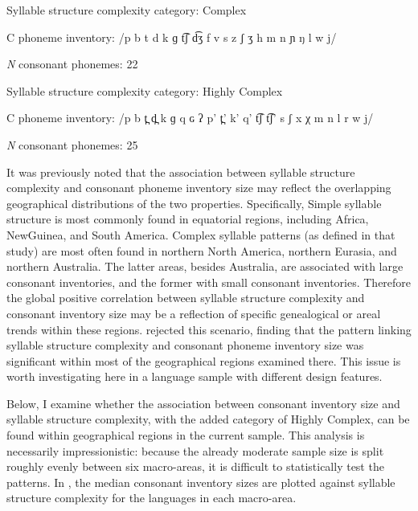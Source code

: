 \ea\label{ex:4.24}
\begin{Coding}
\item[Syllable structure complexity category:] Complex

\item[C phoneme inventory:] /p b t d k ɡ t͡ʃ d͡ʒ f v s z ʃ ʒ h m n ɲ ŋ l w j/

\item[\textit{N} consonant phonemes:] 22
\end{Coding}
\z

\ea\label{ex:4.25}
\begin{Coding}
\item[Syllable structure complexity category:] Highly Complex

\item[C phoneme inventory:] /p b t̪ d̪ k ɡ q ɢ ʔ p’ t̪’ k’ q’ t͡ʃ t͡ʃ’ s ʃ x χ m n l r w j/

\item[\textit{N} consonant phonemes:] 25
\end{Coding}
\z

  It was previously noted that the association between syllable structure complexity and consonant phoneme inventory size may reflect the overlapping geographical distributions of the two properties. Specifically, Simple syllable structure is most commonly found in equatorial regions, including Africa, New\linebreak Guinea, and South America. Complex syllable patterns (as defined in that study) are most often found in northern North America, northern Eurasia, and northern Australia. The latter areas, besides Australia, are associated with large consonant inventories, and the former with small consonant inventories. Therefore the global positive correlation between syllable structure complexity and consonant inventory size may be a reflection of specific genealogical or areal trends within these regions. \citet{Maddieson2006} rejected this scenario, finding that the pattern linking syllable structure complexity and consonant phoneme inventory size was significant within most of the geographical regions examined there. This issue is worth investigating here in a language sample with different design features.

  Below, I examine whether the association between consonant inventory size and syllable structure complexity, with the added category of Highly Complex, can be found within geographical regions in the current sample. This analysis is necessarily impressionistic: because the already moderate sample size is split roughly evenly between six macro-areas, it is difficult to statistically test the patterns. In , the median consonant inventory sizes are plotted against syllable structure complexity for the languages in each macro-area.


